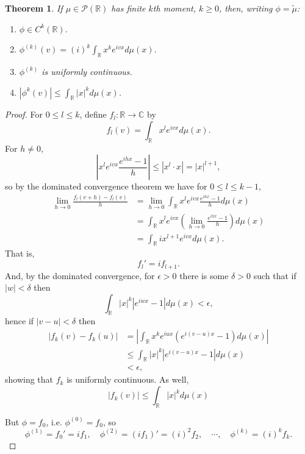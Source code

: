\documentclass{article}
\newtheorem{theorem}{Theorem}
\theoremstyle{definition}
\begin{document}
\begin{theorem}
If $\mu \in \mathscr{P}(\mathbb{R})$ has finite $k$th moment, $k \geq 0$, then, writing $\phi=\tilde{\mu}$:
\begin{enumerate}
\item $\phi \in C^k(\mathbb{R})$. 
\item $\phi^{(k)}(v) = (i)^k \int_\mathbb{R} x^k e^{ivx} d\mu(x)$.
\item $\phi^{(k)}$ is uniformly continuous.
\item $|\phi^k(v)| \leq \int_\mathbb{R} |x|^k d\mu(x)$.
\end{enumerate}
\label{characteristic}
\end{theorem}
\begin{proof}
For $0 \leq l \leq k$, define $f_l:\mathbb{R} \to \mathbb{C}$ by
\[
f_l(v) = \int_\mathbb{R} x^l e^{ivx} d\mu(x).
\]
For $h \neq 0$,
\[
\left| x^l e^{ivx} \frac{e^{ihx}-1}{h} \right| \leq |x^l \cdot x| = |x|^{l+1},
\]
so by the dominated convergence theorem we have for $0 \leq l \leq k-1$,
\begin{align*}
\lim_{h \to 0} \frac{f_l(v+h)-f_l(v)}{h}&=\lim_{h \to 0} \int_\mathbb{R} x^l e^{ivx} \frac{e^{ihx}-1}{h} d\mu(x)\\
&=\int_\mathbb{R}   x^l e^{ivx} \left(\lim_{h \to 0} \frac{e^{ihx}-1}{h}\right) d\mu(x)\\
&=\int_\mathbb{R} i x^{l+1} e^{ivx} d\mu(x).
\end{align*}
That is,
\[
f_l' = i f_{l+1}.
\]
And, by the dominated convergence, for $\epsilon>0$ there is some
$\delta>0$ such that if $|w|<\delta$ then
\[
\int_\mathbb{R} |x|^k |e^{iwx}-1| d\mu(x)<\epsilon,
\]
hence if $|v-u|<\delta$ then
\begin{align*}
|f_k(v)-f_k(u)| &= \left| \int_\mathbb{R} x^k e^{iux}(e^{i(v-u)x}-1) d\mu(x)\right|\\
&\leq \int_\mathbb{R} |x|^k |e^{i(v-u)x}-1| d\mu(x)\\
&<\epsilon, 
\end{align*}
showing that $f_k$ is uniformly continuous.
As well, 
\[
|f_k(v)| \leq \int_\mathbb{R} |x|^k d\mu(x)
\]

But $\phi = f_0$, i.e. $\phi^{(0)}=f_0$, so
\[
\phi^{(1)} = f_0'=if_1, \quad \phi^{(2)}=(if_1)'=(i)^2 f_2,\quad
\cdots, \quad \phi^{(k)}=(i)^k f_k.
\]
\end{proof}
\end{document}
